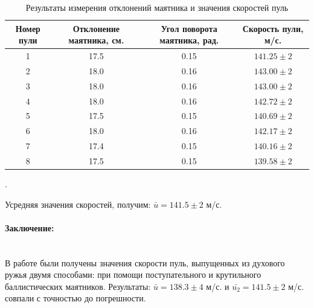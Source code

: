 \documentclass[a4paper, 12pt]{article}
\newcommand{\parag}[1]{\paragraph*{#1:}}
\newcounter{Points}
\newcommand{\point}{\arabic{Points}. \addtocounter{Points}{1}}
\begin{document}
\begin{table}[!h]
    \centering
    \begin{tabular}{|c|c|c|c|}
        \hline
        Номер пули & Отклонение маятника, см. & Угол поворота маятника, рад. & Скорость пули, м/с. \\ \hline
        1 &	17.5	&	0.15	&	$141.25 \pm 2$ \\ \hline
        2 &	18.0	&	0.16	&	$143.00 \pm 2$ \\ \hline
        3 &	18.0	&	0.16	&	$143.00 \pm 2$ \\ \hline
        4 &	18.0	&	0.16	&	$142.72 \pm 2$ \\ \hline
        5 &	17.5	&	0.15	&	$140.69 \pm 2$ \\ \hline
        6 &	18.0	&	0.16	&	$142.17 \pm 2$ \\ \hline
        7 &	17.4	&	0.15	&	$140.16 \pm 2$ \\ \hline
        8 &	17.5	&	0.15	&	$139.58 \pm 2$ \\ \hline

    \end{tabular}
    \caption{Результаты измерения отклонений маятника и значения скоростей пуль}
    \label{tabl:results_2}
\end{table}

\point Усредняя значения скоростей, получим: $\bar{u} = 141.5 \pm 2$ м/с.

\parag {Заключение} ~\\
В работе были получены значения скорости пуль, выпущенных из духового ружья двумя способами: при помощи поступательного и крутильного баллистических маятников. Результаты: $\bar{u} = 138.3 \pm 4$ м/с. и $\bar{u_2} = 141.5 \pm 2$ м/с. совпали с точностью до погрешности. 
\end{document}
